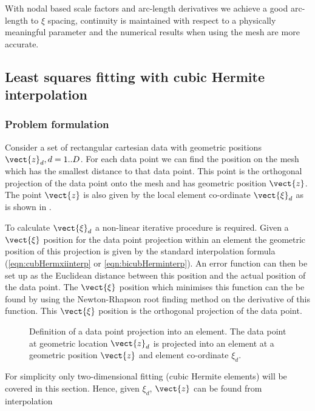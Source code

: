 With nodal based scale factors and arc-length derivatives we achieve a good
arc-length to $\xi$ spacing, continuity is maintained with respect to a
physically meaningful parameter and the numerical results when using the mesh
are more accurate.

\subsection{Least squares fitting with cubic Hermite interpolation}

\subsubsection{Problem formulation}

Consider a set of rectangular cartesian data with geometric positions
$\vect{z}_{d},d=1..D$. For each data point we can find the position on the mesh
which has the smallest distance to that data point. This point is the
orthogonal projection of the data point onto the mesh and has geometric
position $\vect{z}$. The point $\vect{z}$ is also given by the local element
co-ordinate $\vect{\xi}_{d}$ as is shown in .

To calculate $\vect{\xi}_{d}$ a non-linear iterative procedure is required.
Given a $\vect{\xi}$ position for the data point projection within an element
the geometric position of this projection is given by the standard
interpolation formula (\eqref{eqn:cubHermxiinterp} or
\eqref{eqn:bicubHerminterp}). An error function can then be set up as the
Euclidean distance between this position and the actual position of the data
point. The $\vect{\xi}$ position which minimises this function can the be found
by using the Newton-Rhapson root finding method on the derivative of this
function. This $\vect{\xi}$ position is the orthogonal projection of the data
point.

\begin{figure} \centering
  
  \caption{Definition of a data point projection into an element. The data
    point at geometric location $\vect{z}_{d}$ is projected into an element at a
    geometric position $\vect{z}$ and element co-ordinate $\xi_{d}$.}
  \label{fig:dataproj}
\end{figure}

For simplicity only two-dimensional fitting (\ie cubic Hermite elements) will
be covered in this section. Hence, given $\xi_{d}$, $\vect{z}$ can be found from
interpolation \ie
\begin{equation}
  \label{eqn:datapointpos}
\end{equation}

